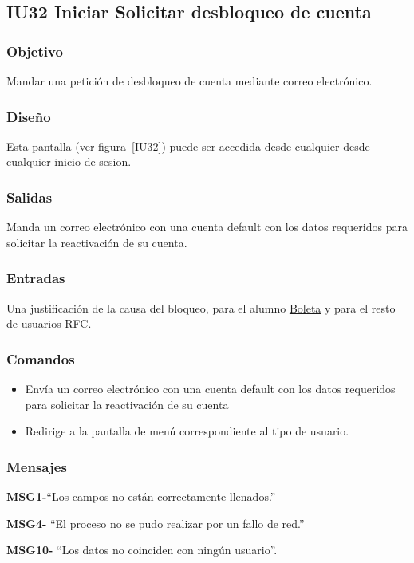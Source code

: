 
\subsection{IU32 Iniciar Solicitar desbloqueo de cuenta}

\subsubsection{Objetivo}
    Mandar una petición de desbloqueo de cuenta mediante correo electrónico.

\subsubsection{Diseño}
	Esta pantalla  (ver figura~\ref{IU32}) puede ser accedida desde cualquier desde cualquier inicio de sesion.



\subsubsection{Salidas}

    Manda un correo electrónico con una cuenta default con los datos requeridos para solicitar la reactivación de su cuenta.

\subsubsection{Entradas}
    Una justificación de la causa del bloqueo, para el alumno \hyperlink{Alumno.Boleta}{Boleta} y para el resto de usuarios \hyperlink{Empleado.RFC}{RFC}.


\subsubsection{Comandos}
\begin{itemize}

    \item {} Envía un correo electrónico con una cuenta default con los datos requeridos para solicitar la reactivación de su cuenta
    \item {} Redirige a la pantalla de menú correspondiente al tipo de usuario.
	
\end{itemize}

\subsubsection{Mensajes}

\begin{Citemize}
	\item {\bf MSG1-}{``Los campos no están correctamente llenados.''}
	\item {\bf MSG4-}  ``El proceso no se pudo realizar por un fallo de red.''
	\item {\bf MSG10-}  ``Los datos no coinciden con ningún usuario''.
\end{Citemize}
